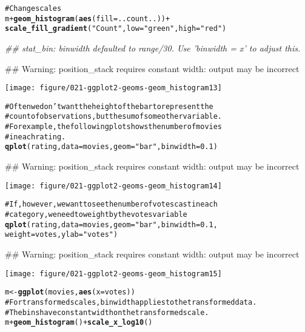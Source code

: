 \documentclass[a4paper,titlepage]{tufte-handout}\usepackage{graphicx, color}
\makeatletter
\def\maxwidth{ %
  \ifdim\Gin@nat@width>\linewidth
    \linewidth
  \else
    \Gin@nat@width
  \fi
}
\newcommand{\hlfunctioncall}[1]{\textcolor[rgb]{0.501960784313725,0,0.329411764705882}{\textbf{#1}}}%
\newcommand{\hlstring}[1]{\textcolor[rgb]{0.6,0.6,1}{#1}}%
\newcommand{\hlcomment}[1]{\textcolor[rgb]{0.180392156862745,0.6,0.341176470588235}{#1}}%
\newenvironment{kframe}{%
 \def\at@end@of@kframe{}%
 \ifinner\ifhmode%
  \def\at@end@of@kframe{\end{minipage}}%
  \begin{minipage}{\columnwidth}%
 \fi\fi%
 \def\FrameCommand##1{\hskip\@totalleftmargin \hskip-\fboxsep
 \colorbox{shadecolor}{##1}\hskip-\fboxsep
     \hskip-\linewidth \hskip-\@totalleftmargin \hskip\columnwidth}%
 \MakeFramed {\advance\hsize-\width
   \@totalleftmargin\z@ \linewidth\hsize
   \@setminipage}}%
 {\par\unskip\endMakeFramed%
 \at@end@of@kframe}
\newenvironment{knitrout}{}{} %
\makeatother
\begin{document}
\begin{knitrout}
\begin{kframe}
\begin{alltt}
\hlcomment{# Change scales}
m + \hlfunctioncall{geom_histogram}(\hlfunctioncall{aes}(fill = ..count..)) +
  \hlfunctioncall{scale_fill_gradient}(\hlstring{"Count"}, low = \hlstring{"green"}, high = \hlstring{"red"})
\end{alltt}


{\ttfamily\noindent\itshape\textcolor{messagecolor}{\#\# stat\_bin: binwidth defaulted to range/30. Use 'binwidth = x' to adjust this.}}

{\ttfamily\noindent\textcolor{warningcolor}{\#\# Warning: position\_stack requires constant width: output may be incorrect}}\end{kframe}
\texttt{[image: figure/021-ggplot2-geoms-geom\_histogram13]} 
\begin{kframe}\begin{alltt}

\hlcomment{# Often we don't want the height of the bar to represent the}
\hlcomment{# count of observations, but the sum of some other variable.}
\hlcomment{# For example, the following plot shows the number of movies}
\hlcomment{# in each rating.}
\hlfunctioncall{qplot}(rating, data=movies, geom=\hlstring{"bar"}, binwidth = 0.1)
\end{alltt}


{\ttfamily\noindent\textcolor{warningcolor}{\#\# Warning: position\_stack requires constant width: output may be incorrect}}\end{kframe}
\texttt{[image: figure/021-ggplot2-geoms-geom\_histogram14]} 
\begin{kframe}\begin{alltt}
\hlcomment{# If, however, we want to see the number of votes cast in each}
\hlcomment{# category, we need to weight by the votes variable}
\hlfunctioncall{qplot}(rating, data=movies, geom=\hlstring{"bar"}, binwidth = 0.1,
  weight=votes, ylab = \hlstring{"votes"})
\end{alltt}


{\ttfamily\noindent\textcolor{warningcolor}{\#\# Warning: position\_stack requires constant width: output may be incorrect}}\end{kframe}
\texttt{[image: figure/021-ggplot2-geoms-geom\_histogram15]} 
\begin{kframe}\begin{alltt}

m <- \hlfunctioncall{ggplot}(movies, \hlfunctioncall{aes}(x = votes))
\hlcomment{# For transformed scales, binwidth applies to the transformed data.}
\hlcomment{# The bins have constant width on the transformed scale.}
m + \hlfunctioncall{geom_histogram}() + \hlfunctioncall{scale_x_log10}()
\end{alltt}



\end{kframe}
\end{knitrout}
\end{document}
